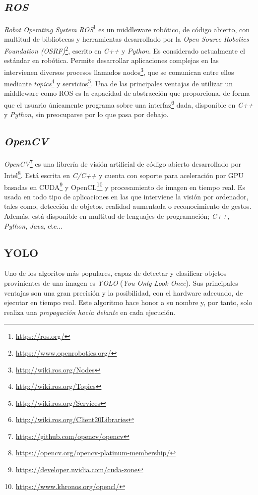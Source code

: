 \subsection{\textit{ROS}}
\label{subsection:ros}
\textit{Robot Operating System ROS}\footnote{\url{https://ros.org/}} es un middleware robótico, de código abierto, con multitud de bibliotecas y herramientas desarrollado por la \textit{Open Source Robotics Foundation (OSRF)}\footnote{\url{https://www.openrobotics.org/}}, escrito en \textit{C++} y \textit{Python}. Es considerado actualmente el estándar en robótica. Permite desarrollar aplicaciones complejas en las intervienen diversos procesos llamados nodos\footnote{\url{http://wiki.ros.org/Nodes}}, que se comunican entre ellos mediante \textit{topics}\footnote{\url{http://wiki.ros.org/Topics}} y servicios\footnote{\url{http://wiki.ros.org/Services}}. Una de las principales ventajas de utilizar un middleware como ROS es la capacidad de abstracción que proporciona, de forma que el usuario únicamente programa sobre una interfaz\footnote{\url{http://wiki.ros.org/Client20Libraries}} dada, disponible en \textit{C++} y \textit{Python}, sin preocuparse por lo que pasa por debajo.\\

\subsection{\textit{OpenCV}}
\label{subsection:opencv}
\textit{OpenCV}\footnote{\url{https://github.com/opencv/opencv}} es una librería de visión artificial de código abierto desarrollado por Intel\footnote{\url{https://opencv.org/opencv-platinum-membership/}}. Está escrita en \textit{C/C++} y cuenta con soporte para aceleración por GPU basadas en CUDA\footnote{\url{https://developer.nvidia.com/cuda-zone}} y OpenCL\footnote{\url{https://www.khronos.org/opencl/}} y procesamiento de imagen en tiempo real. Es usada en todo tipo de aplicaciones en las que interviene la visión por ordenador, tales como, detección de objetos, realidad aumentada o reconocimiento de gestos. Además, está disponible en multitud de lenguajes de programación; \textit{C++}, \textit{Python}, \textit{Java}, etc...\\

\subsection{YOLO}
\label{sec:yolo}

Uno de los algoritos más populares, capaz de detectar y clasificar objetos provinientes de una imagen es \textit{YOLO} (\textit{You Only Look Once})\cite{yolov3}. Sus principales ventajas son una gran precisión y la posibilidad, con el hardware adecuado, de ejecutar en tiempo real. Este algoritmo hace honor a su nombre y, por tanto, solo realiza una \textit{propagación hacia delante} en cada ejecución.\\

